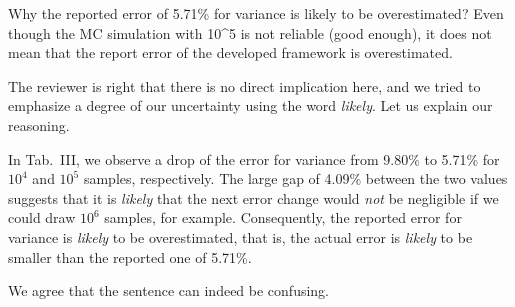 \begin{reviewer}
Why the reported error of 5.71\% for variance is likely to be overestimated? Even though the MC simulation with 10\^{}5 is not reliable (good enough), it does not mean that the report error of the developed framework is overestimated.
\end{reviewer}
\begin{authors}
The reviewer is right that there is no direct implication here, and we tried to emphasize a degree of our uncertainty using the word \emph{likely}.
Let us explain our reasoning.

In Tab.~III, we observe a drop of the error for variance from 9.80\% to 5.71\% for $10^4$ and $10^5$ samples, respectively.
The large gap of 4.09\% between the two values suggests that it is \emph{likely} that the next error change would \emph{not} be negligible if we could draw $10^6$ samples, for example.
Consequently, the reported error for variance is \emph{likely} to be overestimated, that is, the actual error is \emph{likely} to be smaller than the reported one of 5.71\%.

We agree that the sentence can indeed be confusing.

\begin{actions}
\end{actions}
\end{authors}

